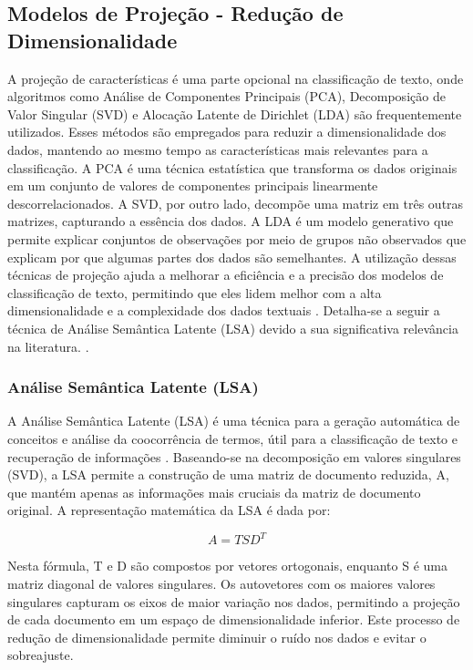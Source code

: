 \subsection{Modelos de Projeção - Redução de Dimensionalidade}

A projeção de características é uma parte opcional na classificação de texto, onde algoritmos como Análise de Componentes Principais (PCA), Decomposição de Valor Singular (SVD) e Alocação Latente de Dirichlet (LDA) são frequentemente utilizados. Esses métodos são empregados para reduzir a dimensionalidade dos dados, mantendo ao mesmo tempo as características mais relevantes para a classificação. A PCA é uma técnica estatística que transforma os dados originais em um conjunto de valores de componentes principais linearmente descorrelacionados. A SVD, por outro lado, decompõe uma matriz em três outras matrizes, capturando a essência dos dados. A LDA é um modelo generativo que permite explicar conjuntos de observações por meio de grupos não observados que explicam por que algumas partes dos dados são semelhantes. A utilização dessas técnicas de projeção ajuda a melhorar a eficiência e a precisão dos modelos de classificação de texto, permitindo que eles lidem melhor com a alta dimensionalidade e a complexidade dos dados textuais \cite{mironczuk2018recent}.   Detalha-se a seguir a técnica de Análise Semântica Latente (LSA) devido a sua significativa relevância na literatura.  \cite{pu2006short}.

\subsubsection{Análise Semântica Latente (LSA)}

A Análise Semântica Latente (LSA) é uma técnica para a geração automática de conceitos e análise da coocorrência de termos, útil para a classificação de texto e recuperação de informações \cite{pu2006short}. Baseando-se na decomposição em valores singulares (SVD), a LSA permite a construção de uma matriz de documento reduzida, A, que mantém apenas as informações mais cruciais da matriz de documento original. A representação matemática da LSA é dada por:

\begin{equation}
    A = TSD^T
\end{equation}

Nesta fórmula, T e D são compostos por vetores ortogonais, enquanto S é uma matriz diagonal de valores singulares. Os autovetores com os maiores valores singulares capturam os eixos de maior variação nos dados, permitindo a projeção de cada documento em um espaço de dimensionalidade inferior. Este processo de redução de dimensionalidade permite diminuir o ruído nos dados e evitar o sobreajuste.

